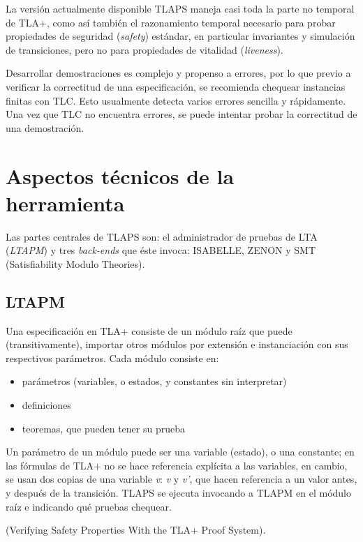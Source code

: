 \documentclass[spanish]{llncs}
\begin{document}
  La versión actualmente disponible TLAPS maneja casi toda la parte no temporal de TLA+, como así también el razonamiento temporal necesario para probar propiedades de seguridad (\textit{safety}) estándar, en particular invariantes y simulación de transiciones, pero no para propiedades de vitalidad (\textit{liveness}).
  
  Desarrollar demostraciones es complejo y propenso a errores, por lo que previo a verificar la correctitud de una especificación,
  se recomienda chequear instancias finitas con TLC. Esto usualmente detecta varios errores sencilla y rápidamente. 
  Una vez que TLC no encuentra errores, se puede intentar probar la correctitud de una demostración. 

  
\section{Aspectos técnicos de la herramienta}

Las partes centrales de TLAPS son: el administrador de pruebas de LTA (\textit{LTAPM}) y tres \textit{back-ends} que éste invoca: ISABELLE, ZENON y SMT (Satisfiability Modulo Theories).

  \subsection{LTAPM}
  
  Una especificación en TLA+ consiste de un módulo raíz que puede (transitivamente), importar otros módulos por extensión e instanciación con
  sus respectivos parámetros. Cada módulo consiste en:

  \begin{itemize}
   \item parámetros (variables, o estados, y constantes sin interpretar)
   \item definiciones
   \item teoremas, que pueden tener su prueba
  \end{itemize}

  Un parámetro de un módulo puede ser una variable (estado), o una constante; en las fórmulas de TLA+ no se hace referencia explícita a las variables, en cambio, se usan dos copias de una variable \textit{v}: \textit{v} y \textit{v'}, que hacen referencia a un valor antes, y después de la transición. 
  TLAPS se ejecuta invocando a TLAPM en el módulo raíz e indicando qué pruebas chequear. 

  (Verifying Safety Properties With the TLA+ Proof System).
  \\
  
\end{document}
